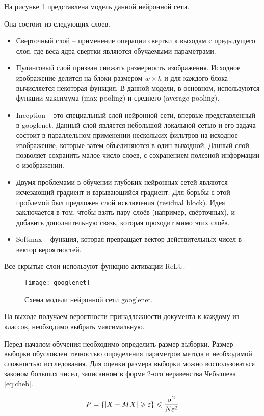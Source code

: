 На рисунке \ref{img:googlenet} представлена модель данной нейронной сети.

Она состоит из следующих слоев.
\begin{itemize}
\item Сверточный слой -- применение операции свертки к выходам с предыдущего слоя, где веса ядра свертки являются обучаемыми параметрами. 
\item Пулинговый слой призван снижать размерность изображения. Исходное изображение делится на блоки размером $w \times h$ и для каждого блока вычисляется некоторая функция. В данной модели, в основном, используются функции максимума (max pooling) и среднего (average pooling). 
\item  Inception -- это специальный слой нейронной сети, впервые представленный в googlenet. Данный слой является небольшой локальной сетью и его задача состоит в параллельном применении нескольких фильтров на исходное изображение, которые затем объединяются в один выходной. Данный слой позволяет сохранить малое число слоев, с сохранением полезной информации о изображении.
\item  Двумя проблемами в обучении глубоких нейронных сетей являются исчезающий градиент и взрывающийся градиент. Для борьбы с этой проблемой был предложен слой исключения (residual block). Идея заключается в том, чтобы взять пару слоёв (например, свёрточных), и добавить дополнительную связь, которая проходит мимо этих слоёв. 
\item  Softmax -- функция, которая превращает вектор действительных чисел в вектор вероятностей. 
\end{itemize}

Все скрытые слои используют функцию активации ReLU.
 
\begin{figure}[H]
	\centering
	\texttt{[image: googlenet]}
	\caption{Схема модели нейронной сети googlenet. }
	\label{img:googlenet}
\end{figure}

На выходе получаем вероятности принадлежности документа к каждому из классов, необходимо выбрать максимальную.

Перед началом обучения необходимо определить размер выборки. Размер выборки обусловлен точностью определения параметров метода и необходимой сложностью исследования. Для оценки размера выборки можно воспользоваться законом больших чисел, записанном в форме 2-ого неравенства Чебышева \ref{eq:cheb}. \cite{cheb}

\begin{equation}
	\centering
	P = \{|X-MX| \geq \varepsilon\}\leq \frac{\sigma^2}{N\varepsilon^2}
	\label{eq:cheb}
\end{equation}

